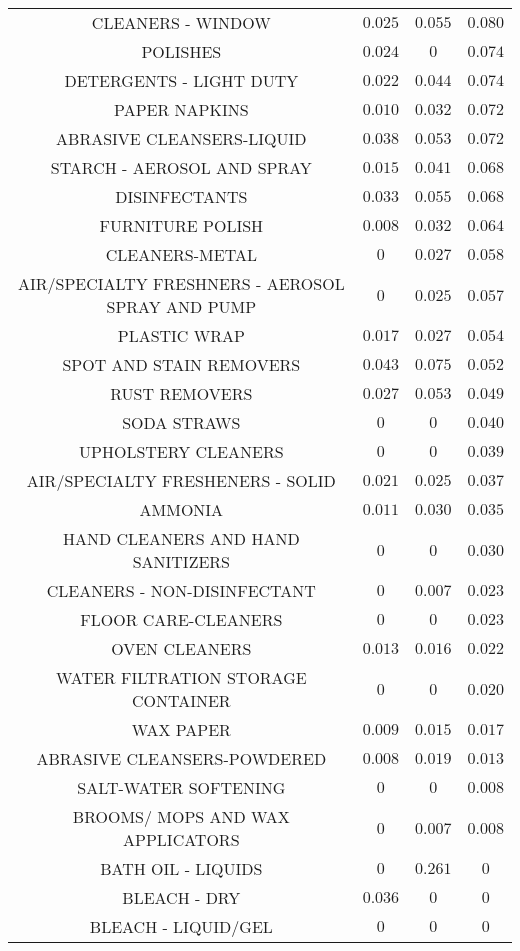 \begin{table}[!htbp]
{\begin{tabular}{@{\extracolsep{5pt}} cccc}
CLEANERS - WINDOW & $0.025$ & $0.055$ & $0.080$ \\
POLISHES & $0.024$ & $0$ & $0.074$ \\
DETERGENTS - LIGHT DUTY & $0.022$ & $0.044$ & $0.074$ \\
PAPER NAPKINS & $0.010$ & $0.032$ & $0.072$ \\
ABRASIVE CLEANSERS-LIQUID & $0.038$ & $0.053$ & $0.072$ \\
STARCH - AEROSOL AND SPRAY & $0.015$ & $0.041$ & $0.068$ \\
DISINFECTANTS & $0.033$ & $0.055$ & $0.068$ \\
FURNITURE POLISH & $0.008$ & $0.032$ & $0.064$ \\
CLEANERS-METAL & $0$ & $0.027$ & $0.058$ \\
AIR/SPECIALTY FRESHNERS - AEROSOL SPRAY AND PUMP & $0$ & $0.025$ & $0.057$ \\
PLASTIC WRAP & $0.017$ & $0.027$ & $0.054$ \\
SPOT AND STAIN REMOVERS & $0.043$ & $0.075$ & $0.052$ \\
RUST REMOVERS & $0.027$ & $0.053$ & $0.049$ \\
SODA STRAWS & $0$ & $0$ & $0.040$ \\
UPHOLSTERY CLEANERS & $0$ & $0$ & $0.039$ \\
AIR/SPECIALTY FRESHENERS - SOLID & $0.021$ & $0.025$ & $0.037$ \\
AMMONIA & $0.011$ & $0.030$ & $0.035$ \\
HAND CLEANERS AND HAND SANITIZERS & $0$ & $0$ & $0.030$ \\
CLEANERS - NON-DISINFECTANT & $0$ & $0.007$ & $0.023$ \\
FLOOR CARE-CLEANERS & $0$ & $0$ & $0.023$ \\
OVEN CLEANERS & $0.013$ & $0.016$ & $0.022$ \\
WATER FILTRATION STORAGE CONTAINER & $0$ & $0$ & $0.020$ \\
WAX PAPER & $0.009$ & $0.015$ & $0.017$ \\
ABRASIVE CLEANSERS-POWDERED & $0.008$ & $0.019$ & $0.013$ \\
SALT-WATER SOFTENING & $0$ & $0$ & $0.008$ \\
BROOMS/ MOPS AND WAX APPLICATORS & $0$ & $0.007$ & $0.008$ \\
BATH OIL - LIQUIDS & $0$ & $0.261$ & $0$ \\
BLEACH - DRY & $0.036$ & $0$ & $0$ \\
BLEACH - LIQUID/GEL & $0$ & $0$ & $0$ \\

\end{tabular}}
\end{table}
